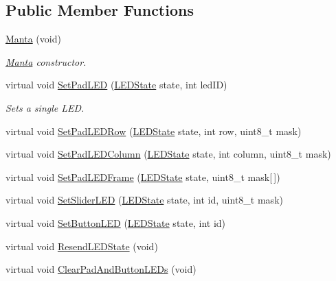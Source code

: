 \subsection*{\-Public \-Member \-Functions}
\begin{DoxyCompactItemize}
\item 
\hyperlink{classManta_a03d7d49f5dcce38a1a6652fb711e4d65}{\-Manta} (void)
\begin{DoxyCompactList}\small\item\em \hyperlink{classManta}{\-Manta} constructor. \end{DoxyCompactList}\item 
virtual void \hyperlink{classManta_a57659b89bd28a2677fd22915d9ee1571}{\-Set\-Pad\-L\-E\-D} (\hyperlink{classMantaServer_aefb7bb68319a53280ef9e9f84147288d}{\-L\-E\-D\-State} state, int led\-I\-D)
\begin{DoxyCompactList}\small\item\em \-Sets a single \-L\-E\-D. \end{DoxyCompactList}\item 
virtual void \hyperlink{classManta_a8573c492bc32332221a5f305d64128c3}{\-Set\-Pad\-L\-E\-D\-Row} (\hyperlink{classMantaServer_aefb7bb68319a53280ef9e9f84147288d}{\-L\-E\-D\-State} state, int row, uint8\-\_\-t mask)
\item 
virtual void \hyperlink{classManta_a539d6084bb4338ab21c55ef2da3ff989}{\-Set\-Pad\-L\-E\-D\-Column} (\hyperlink{classMantaServer_aefb7bb68319a53280ef9e9f84147288d}{\-L\-E\-D\-State} state, int column, uint8\-\_\-t mask)
\item 
virtual void \hyperlink{classManta_ae142d20041f7621e45c530b349310e91}{\-Set\-Pad\-L\-E\-D\-Frame} (\hyperlink{classMantaServer_aefb7bb68319a53280ef9e9f84147288d}{\-L\-E\-D\-State} state, uint8\-\_\-t mask\mbox{[}$\,$\mbox{]})
\item 
virtual void \hyperlink{classManta_a842a4ca78371a4b224e1608aaed4a9f2}{\-Set\-Slider\-L\-E\-D} (\hyperlink{classMantaServer_aefb7bb68319a53280ef9e9f84147288d}{\-L\-E\-D\-State} state, int id, uint8\-\_\-t mask)
\item 
virtual void \hyperlink{classManta_af1d99e787eb026b1def9ca0691ce2aee}{\-Set\-Button\-L\-E\-D} (\hyperlink{classMantaServer_aefb7bb68319a53280ef9e9f84147288d}{\-L\-E\-D\-State} state, int id)
\item 
virtual void \hyperlink{classManta_a19fc4f642b9b53a9bd6ab23d58188775}{\-Resend\-L\-E\-D\-State} (void)
\item 
virtual void \hyperlink{classManta_a2483e6e579a859261814c3bf36c8c145}{\-Clear\-Pad\-And\-Button\-L\-E\-Ds} (void)

\end{DoxyCompactItemize}
